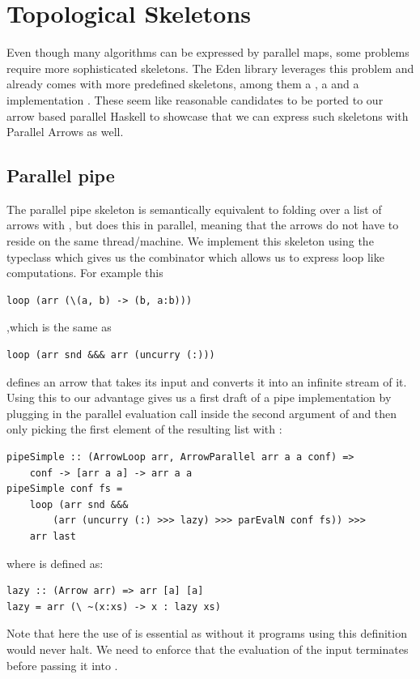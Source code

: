 \section{Topological Skeletons}
\label{sec:topology-skeletons}
Even though many algorithms can be expressed by parallel maps, some problems require more sophisticated skeletons. The Eden library leverages this problem and already comes with more predefined skeletons, among them a , a  and a  implementation \cite{eden_cefp, eden_skel_topology}. These seem like reasonable candidates to be ported to our arrow based parallel Haskell to showcase that we can express such skeletons with Parallel Arrows as well.

\subsection{Parallel pipe}

The parallel pipe skeleton is semantically equivalent to folding over a list \code{[arr a a]} of arrows with \code{>>>}, but does this in parallel, meaning that the arrows do not have to reside on the same thread/machine. We implement this skeleton using the  typeclass which gives us the  combinator which allows us to express loop like computations. For example this
\begin{lstlisting}[frame=htrbl]
loop (arr (\(a, b) -> (b, a:b)))
\end{lstlisting}
,which is the same as
\begin{lstlisting}[frame=htrbl]
loop (arr snd &&& arr (uncurry (:)))
\end{lstlisting}
defines an arrow that takes its input  and converts it into an infinite stream \code{[a]} of it. Using this to our advantage gives us a first draft of a pipe implementation by plugging in the parallel evaluation call  inside the second argument of \code{&&&} and then only picking the first element of the resulting list with :
\begin{lstlisting}[frame=htrbl]
pipeSimple :: (ArrowLoop arr, ArrowParallel arr a a conf) =>
	conf -> [arr a a] -> arr a a
pipeSimple conf fs =
	loop (arr snd &&&
		(arr (uncurry (:) >>> lazy) >>> parEvalN conf fs)) >>>
	arr last
\end{lstlisting}
where  is defined as:
\begin{lstlisting}[frame=htrbl]
lazy :: (Arrow arr) => arr [a] [a]
lazy = arr (\ ~(x:xs) -> x : lazy xs)
\end{lstlisting}
Note that here the use of  is essential as without it programs using this definition would never halt. We need to enforce that the evaluation of the input \code{[a]} terminates before passing it into .


